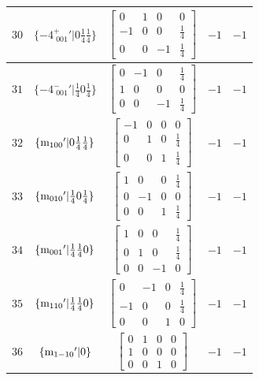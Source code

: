 \documentclass[fleqn,8pt]{jsarticle}
\begin{document}
\begin{longtable}{ccccc}
$ 30 $ & $ \{-4^{+}_{\,\,001}{}'|0 \frac{1}{4} \frac{1}{4}\} $ & $ \begin{bmatrix} 0 & 1 & 0 & 0 \\ -1 & 0 & 0 & \frac{1}{4} \\ 0 & 0 & -1 & \frac{1}{4} \end{bmatrix} $ & $ -1 $ & $ -1 $ \\ \hline
$ 31 $ & $ \{-4^{-}_{\,\,001}{}'|\frac{1}{4} 0 \frac{1}{4}\} $ & $ \begin{bmatrix} 0 & -1 & 0 & \frac{1}{4} \\ 1 & 0 & 0 & 0 \\ 0 & 0 & -1 & \frac{1}{4} \end{bmatrix} $ & $ -1 $ & $ -1 $ \\ \hline
$ 32 $ & $ \{{\rm m}_{100}{}'|0 \frac{1}{4} \frac{1}{4}\} $ & $ \begin{bmatrix} -1 & 0 & 0 & 0 \\ 0 & 1 & 0 & \frac{1}{4} \\ 0 & 0 & 1 & \frac{1}{4} \end{bmatrix} $ & $ -1 $ & $ -1 $ \\ \hline
$ 33 $ & $ \{{\rm m}_{010}{}'|\frac{1}{4} 0 \frac{1}{4}\} $ & $ \begin{bmatrix} 1 & 0 & 0 & \frac{1}{4} \\ 0 & -1 & 0 & 0 \\ 0 & 0 & 1 & \frac{1}{4} \end{bmatrix} $ & $ -1 $ & $ -1 $ \\ \hline
$ 34 $ & $ \{{\rm m}_{001}{}'|\frac{1}{4} \frac{1}{4} 0\} $ & $ \begin{bmatrix} 1 & 0 & 0 & \frac{1}{4} \\ 0 & 1 & 0 & \frac{1}{4} \\ 0 & 0 & -1 & 0 \end{bmatrix} $ & $ -1 $ & $ -1 $ \\ \hline
$ 35 $ & $ \{{\rm m}_{110}{}'|\frac{1}{4} \frac{1}{4} 0\} $ & $ \begin{bmatrix} 0 & -1 & 0 & \frac{1}{4} \\ -1 & 0 & 0 & \frac{1}{4} \\ 0 & 0 & 1 & 0 \end{bmatrix} $ & $ -1 $ & $ -1 $ \\ \hline
$ 36 $ & $ \{{\rm m}_{1-10}{}'|0\} $ & $ \begin{bmatrix} 0 & 1 & 0 & 0 \\ 1 & 0 & 0 & 0 \\ 0 & 0 & 1 & 0 \end{bmatrix} $ & $ -1 $ & $ -1 $ \\ \hline

\end{longtable}
\end{document}
